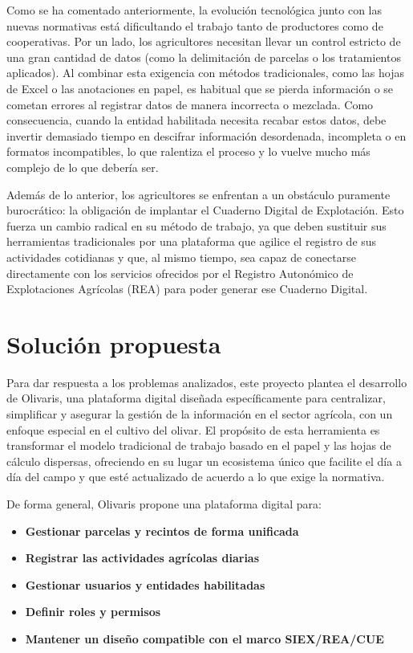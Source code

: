 Como se ha comentado anteriormente, la evolución tecnológica junto con las nuevas normativas está dificultando el trabajo tanto de productores como de cooperativas. Por un lado, los agricultores necesitan llevar un control 
estricto de una gran cantidad de datos (como la delimitación de parcelas o los tratamientos aplicados). Al combinar esta exigencia con métodos tradicionales, como las hojas de Excel o las anotaciones en papel, es habitual 
que se pierda información o se cometan errores al registrar datos de manera incorrecta o mezclada. Como consecuencia, cuando la entidad habilitada necesita recabar estos datos, debe invertir demasiado tiempo en descifrar 
información desordenada, incompleta o en formatos incompatibles, lo que ralentiza el proceso y lo vuelve mucho más complejo de lo que debería ser.

Además de lo anterior, los agricultores se enfrentan a un obstáculo puramente burocrático: la obligación de implantar el Cuaderno Digital de Explotación. Esto fuerza un cambio radical en su método de trabajo, ya que deben 
sustituir sus herramientas tradicionales por una plataforma que agilice el registro de sus actividades cotidianas y que, al mismo tiempo, sea capaz de conectarse directamente con los servicios ofrecidos por el Registro 
Autonómico de Explotaciones Agrícolas (REA) para poder generar ese Cuaderno Digital.

\section{Solución propuesta}

Para dar respuesta a los problemas analizados, este proyecto plantea el desarrollo de Olivaris, una plataforma digital diseñada específicamente para centralizar, simplificar y asegurar la gestión de la información en el 
sector agrícola, con un enfoque especial en el cultivo del olivar. El propósito de esta herramienta es transformar el modelo tradicional de trabajo basado en el papel y las hojas de cálculo dispersas, ofreciendo en su 
lugar un ecosistema único que facilite el día a día del campo y que esté actualizado de acuerdo a lo que exige la normativa.

De forma general, Olivaris propone una plataforma digital para:

\begin{itemize}
    \item \textbf{Gestionar parcelas y recintos de forma unificada}

    \item \textbf{Registrar las actividades agrícolas diarias} 

    \item \textbf{Gestionar usuarios y entidades habilitadas} 
    
    \item \textbf{Definir roles y permisos} 

    \item \textbf{Mantener un diseño compatible con el marco SIEX/REA/CUE} 
\end{itemize}


